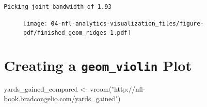 \documentclass[
  letterpaper,
]{krantz}
\newenvironment{Shaded}{\begin{snugshade}}{\end{snugshade}}
\newcommand{\FunctionTok}[1]{\textcolor[rgb]{0.28,0.35,0.67}{#1}}
\newcommand{\NormalTok}[1]{\textcolor[rgb]{0.00,0.23,0.31}{#1}}
\newcommand{\OtherTok}[1]{\textcolor[rgb]{0.00,0.23,0.31}{#1}}
\newcommand{\StringTok}[1]{\textcolor[rgb]{0.13,0.47,0.30}{#1}}
\begin{document}
\begin{verbatim}
Picking joint bandwidth of 1.93
\end{verbatim}

\begin{figure}[H]

{\centering \texttt{[image: 04-nfl-analytics-visualization\_files/figure-pdf/finished\_geom\_ridges-1.pdf]}

}

\end{figure}

\hypertarget{creating-a-geom_violin-plot}{%
\section{\texorpdfstring{Creating a \texttt{geom\_violin}
Plot}{Creating a geom\_violin Plot}}\label{creating-a-geom_violin-plot}}

\begin{Shaded}
\begin{Highlighting}[]
\NormalTok{yards\_gained\_compared }\OtherTok{\textless{}{-}} \FunctionTok{vroom}\NormalTok{(}\StringTok{"http://nfl{-}book.bradcongelio.com/yards\_gained"}\NormalTok{)}
\end{Highlighting}
\end{Shaded}
\end{document}
